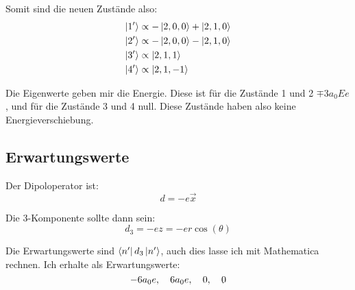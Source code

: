 Somit sind die neuen Zustände also:
\begin{align*}
	\ket{1'} &\propto - \ket{2, 0, 0} + \ket{2, 1, 0} \\
	\ket{2'} &\propto - \ket{2, 0, 0} - \ket{2, 1, 0} \\
	\ket{3'} &\propto \ket{2, 1, 1} \\
	\ket{4'} &\propto \ket{2, 1, -1}
\end{align*}

Die Eigenwerte geben mir die Energie. Diese ist für die Zustände 1 und 2 $\mp 3
a_0 E e$, und für die Zustände 3 und 4 null. Diese Zustände haben also keine
Energieverschiebung.

\subsection{Erwartungswerte}

Der Dipoloperator ist:
\[
	d = - e \vec x
\]

Die 3-Komponente sollte dann sein:
\[
	d_3 = - ez
	= - er \cos(\theta)
\]

Die Erwartungswerte sind $\bra{n'} d_3 \ket{n'}$, auch dies lasse ich mit
Mathematica rechnen. Ich erhalte als Erwartungswerte:
\[
	- 6 a_0 e
	,\quad
	6 a_0 e
	,\quad
	0
	,\quad
	0
\]

%


\IfFileExists{\bibliographyfile}{
}{}



